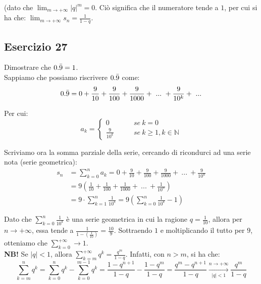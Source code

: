 \documentclass{article}
\begin{document}
\noindent (dato che $\lim_{m \to +\infty} |q|^m = 0$. Ciò significa che il numeratore tende a $1$, per cui si ha che: $\lim_{m \to +\infty} s_n = \frac{1}{1 - q}$.

\subsection{Esercizio 27}
Dimostrare che $0.\Bar{9} = 1$.\\
Sappiamo che possiamo riscrivere $0.\Bar{9}$ come:
\begin{equation*}
    0.\Bar{9} = 0 + \frac{9}{10} + \frac{9}{100} + \frac{9}{1000} + \ ... \ + \frac{9}{10^k} + \ ...
\end{equation*}

\noindent Per cui:
\begin{equation*}
    a_k = \begin{cases}
    0 \qquad & se \ k = 0 \\
    \frac{9}{10^k} \qquad & se \ k \geq 1, k \in \mathbb{N}
\end{cases}
\end{equation*}

\noindent Scriviamo ora la somma parziale della serie, cercando di ricondurci ad una serie nota (serie geometrica):
\begin{align*}
    s_n &= \sum_{k = 0}^n a_k = 0 + \frac{9}{10} + \frac{9}{100} + \frac{9}{1000} + \ ... \ + \frac{9}{10^n} \\
    &= 9\left(\frac{1}{10} + \frac{1}{100} + \frac{1}{1000} + \ ... \ + \frac{1}{10^n} \right) \\
    &= 9 \cdot \sum_{k = 1}^n \frac{1}{10^k} = 9 \left(\sum_{k = 0}^n \frac{1}{10^k} - 1\right)
\end{align*}

\noindent Dato che $\sum_{k = 0}^n \frac{1}{10^k}$ è una serie geometrica in cui la ragione $q = \frac{1}{10}$, allora per $n \to +\infty$, essa tende a $\frac{1}{1 - (\frac{1}{10})} = \frac{10}{9}$. Sottraendo $1$ e moltiplicando il tutto per $9$, otteniamo che $\sum_{k = 0}^{+\infty} \to 1$.\\

\noindent\textbf{NB!} Se $|q| < 1$, allora $\sum_{k = m}^{+\infty} q^k = \frac{q^m}{1 - q}$. Infatti, con $n > m$, si ha che:
\begin{equation*}
    \sum_{k = m}^{n} q^k = \sum_{k = 0}^{n} q^k - \sum_{k = 0}^{m - 1} q^k = \frac{1 - q^{n + 1}}{1 - q} - \frac{1 - q^m}{1 - q} = \frac{q^m - q^{n + 1}}{1 - q} \overset{n \to +\infty}{\underset{|q| < 1}{\longrightarrow}} \frac{q^m}{1 - q}
\end{equation*}
\end{document}
